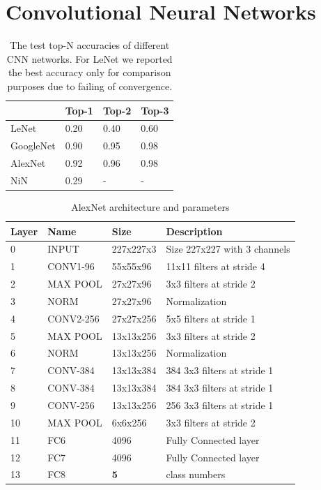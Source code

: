 \section{Convolutional Neural Networks}


\begin{table}[t]
\centering
\begin{tabular}{|l|l|l|l|}
\hline
 & Top-1 & Top-2 & Top-3 \\ \hline
LeNet & 0.20 &  0.40 & 0.60 \\ \hline
GoogleNet &  0.90 & 0.95 & 0.98 \\ \hline
AlexNet &  0.92 & 0.96 & 0.98 \\ \hline
NiN &  0.29 & - & - \\ \hline
\end{tabular}
\caption{The test top-N accuracies of different CNN networks. For LeNet we reported the best accuracy only for comparison purposes due to failing of convergence.}
\label{CNN_test_accuracies}
\end{table}

\begin{table}[t]
\centering
\scriptsize
\begin{tabular}{|l|l|l|l|}
\hline
Layer & Name & Size & Description \\ \hline
0 & INPUT & 227x227x3 & Size 227x227 with 3 channels \\ \hline
1 & CONV1-96 & 55x55x96 & 11x11 filters at stride 4 \\ \hline
2 & MAX POOL & 27x27x96 & 3x3 filters at stride 2 \\ \hline
3 & NORM & 27x27x96 & Normalization \\ \hline
4 & CONV2-256 & 27x27x256 & 5x5 filters at stride 1 \\ \hline
5 & MAX POOL & 13x13x256 & 3x3 filters at stride 2 \\ \hline
6 & NORM & 13x13x256 & Normalization \\ \hline
7 & CONV-384 & 13x13x384 & 384 3x3 filters at stride 1 \\ \hline
8 & CONV-384 & 13x13x384 & 384 3x3 filters at stride 1 \\ \hline
9 & CONV-256 & 13x13x256 & 256 3x3 filters at stride 1 \\ \hline
10 & MAX POOL & 6x6x256 & 3x3 filters at stride 2 \\ \hline
11 & FC6 & 4096 & Fully Connected layer\\ \hline
12 & FC7 & 4096 &  Fully Connected layer \\ \hline
13 & FC8 & \textbf{5} & class numbers \\ \hline
\end{tabular}
\caption{ AlexNet architecture and parameters}
\label{alexnetstructure}
\end{table}

